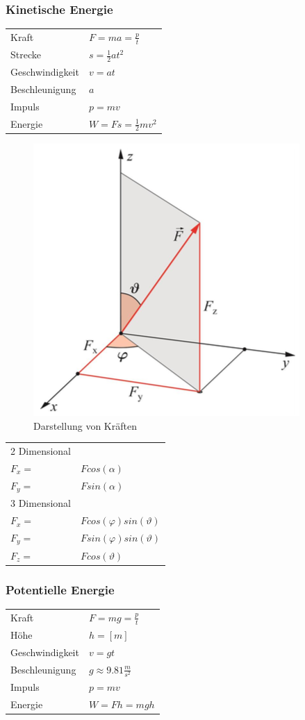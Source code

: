 \documentclass[a4paper]{scrartcl}
\begin{document}
\subsubsection{Kinetische Energie}
	\begin{tabu} {l X}
		Kraft & $F = ma = \frac{p}{t}$ \\
		Strecke & $s = \frac{1}{2} a t^2$ \\
		Geschwindigkeit & $v = at$ \\
		Beschleunigung & $a$\\
		Impuls & $p = mv$ \\
		Energie & $W = Fs = \frac{1}{2} mv^2$
	\end{tabu}
			
	\begin{figure}[h]
		\centering
		\includegraphics[width=0.3\linewidth]{img/darstellungKraefte.png}
		\caption{Darstellung von Kräften}
		\label{fig:darstellungkraefte}
	\end{figure}
		\begin{tabu} {l X}
			2 Dimensional \\
			$F_x = $ & $Fcos(\alpha)$ \\
			$F_y = $ & $Fsin(\alpha)$ \\
			3 Dimensional \\
			$F_x = $ & $Fcos(\varphi)sin(\vartheta)$ \\
			$F_y = $ & $Fsin(\varphi)sin(\vartheta)$ \\
			$F_z = $ & $Fcos(\vartheta)$ \\
		\end{tabu}

\subsubsection{Potentielle Energie}

\begin{tabu} {l X}
	Kraft & $F = mg = \frac{p}{t}$ \\
	Höhe & $h = \left[ m \right]$ \\
	Geschwindigkeit & $v = gt$ \\
	Beschleunigung & $g \approx 9.81 \frac{m}{s^2}$ \\
	Impuls & $p = mv$ \\
	Energie & $W = Fh = mgh$
\end{tabu}
\end{document}
